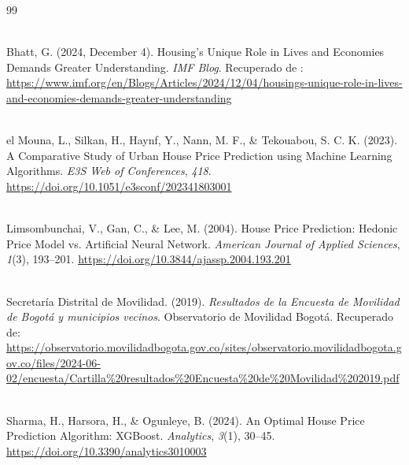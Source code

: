 \documentclass[article,11 pt]{article}
\begin{document}
\newpage
\begin{thebibliography}{99} %

\\

Bhatt, G. (2024, December 4). Housing's Unique Role in Lives and Economies Demands Greater Understanding. \textit{IMF Blog}. Recuperado de : \url{https://www.imf.org/en/Blogs/Articles/2024/12/04/housings-unique-role-in-lives-and-economies-demands-greater-understanding}

\\

el Mouna, L., Silkan, H., Haynf, Y., Nann, M. F., \& Tekouabou, S. C. K. (2023). A Comparative Study of Urban House Price Prediction using Machine Learning Algorithms. \textit{E3S Web of Conferences}, \textit{418}. \url{https://doi.org/10.1051/e3sconf/202341803001}

\\

Limsombunchai, V., Gan, C., \& Lee, M. (2004). House Price Prediction: Hedonic Price Model vs. Artificial Neural Network. \textit{American Journal of Applied Sciences}, \textit{1}(3), 193--201. \url{https://doi.org/10.3844/ajassp.2004.193.201}

\\

 Secretaría Distrital de Movilidad. (2019). \emph{Resultados de la Encuesta de Movilidad de Bogotá y municipios vecinos}. Observatorio de Movilidad Bogotá. Recuperado de: \url{https://observatorio.movilidadbogota.gov.co/sites/observatorio.movilidadbogota.gov.co/files/2024-06-02/encuesta/Cartilla%20resultados%20Encuesta%20de%20Movilidad%202019.pdf}



\\

Sharma, H., Harsora, H., \& Ogunleye, B. (2024). An Optimal House Price Prediction Algorithm: XGBoost. \textit{Analytics}, \textit{3}(1), 30--45. \url{https://doi.org/10.3390/analytics3010003}



\end{thebibliography}
\end{document}
